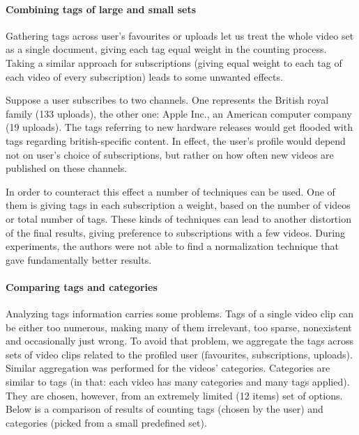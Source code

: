 \paragraph{Combining tags of large and small sets}
Gathering tags across user's favourites or uploads let us treat the whole video
set as a single document, giving each tag equal weight in the counting process.
Taking a similar approach for subscriptions (\eg giving equal weight to each
tag of each video of every subscription) leads to some unwanted effects.

Suppose a user subscribes to two channels. One represents the British royal
family (133 uploads), the other one: Apple Inc., an American computer company
(19 uploads). The tags referring to new hardware releases would get flooded with
tags regarding british-specific content. In effect, the user's profile would
depend not on user's choice of subscriptions, but rather on how often new videos
are published on these channels.

In order to counteract this effect a number of techniques can be used. One of
them is giving tags in each subscription a weight, based on the number of videos or
total number of tags. These kinds of techniques can lead to another distortion of
the final results, giving preference to subscriptions with a few videos.
During experiments, the authors were not able to find a normalization technique
that gave fundamentally better results.

\paragraph{Comparing tags and categories}

Analyzing tags information carries some problems. Tags of a single video clip
can be either too numerous, making many
of them irrelevant, too sparse, nonexistent and occasionally just wrong. To avoid
that problem, we aggregate the tags across sets of video clips related to the
profiled user (favourites, subscriptions, uploads). Similar aggregation was
performed for the videos' categories. Categories are similar to tags (in that:
each video has many categories and many tags applied). They are chosen,
however, from an extremely limited (12 items) set
of options.  Below is a comparison of results of counting
tags (chosen by the user) and categories (picked from a small predefined set).

